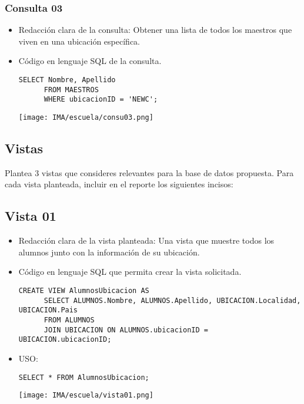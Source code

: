 \subsubsection*{Consulta 03}
\begin{itemize}
    \item Redacción clara de la consulta:  Obtener una lista de todos los maestros que viven en una ubicación específica.
    \item Código en lenguaje SQL de la consulta.
    
    \begin{lstlisting}[caption={Tablas para la BdDatos}, label={lst:sql_estadios}]
      SELECT Nombre, Apellido
      FROM MAESTROS
      WHERE ubicacionID = 'NEWC';
    \end{lstlisting}    

    \begin{center}
      \texttt{[image: IMA/escuela/consu03.png]}
    \end{center}

\end{itemize}

\subsection{Vistas}

Plantea 3 vistas que consideres relevantes para la base de datos propuesta. Para cada vista planteada, incluir en el reporte los siguientes incisos:

\subsection*{Vista 01}
\begin{itemize}
    \item Redacción clara de la vista planteada: Una vista que muestre todos los alumnos junto con la información de su ubicación.
    \item Código en lenguaje SQL que permita crear la vista solicitada.
    
    \begin{lstlisting}[caption={Tablas para la BdDatos}, label={lst:sql_estadios}]
      CREATE VIEW AlumnosUbicacion AS
      SELECT ALUMNOS.Nombre, ALUMNOS.Apellido, UBICACION.Localidad, UBICACION.Pais
      FROM ALUMNOS
      JOIN UBICACION ON ALUMNOS.ubicacionID = UBICACION.ubicacionID;
    \end{lstlisting}    
    
    \item USO:
    
    \begin{lstlisting}[caption={Tablas para la BdDatos}, label={lst:sql_estadios}]
      SELECT * FROM AlumnosUbicacion;
    \end{lstlisting}    

    \begin{center}
      \texttt{[image: IMA/escuela/vista01.png]}
    \end{center}
\end{itemize}


